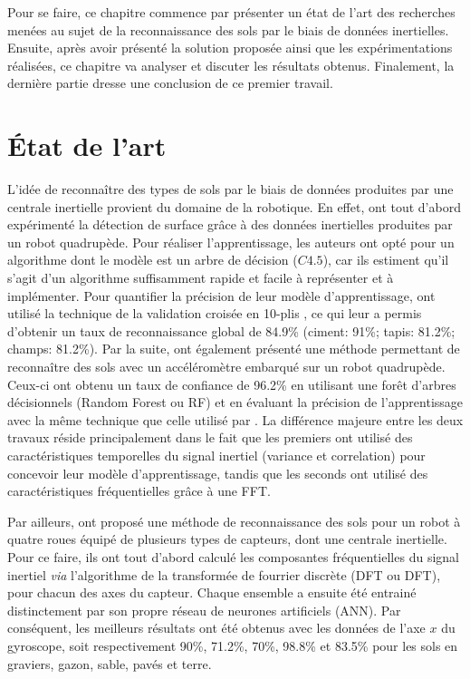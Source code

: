 Pour se faire, ce chapitre commence par présenter un état de l'art des recherches menées au sujet de la reconnaissance des sols par le biais de données inertielles. Ensuite, après avoir présenté la solution proposée ainsi que les expérimentations réalisées, ce chapitre va analyser et discuter les résultats obtenus. Finalement, la dernière partie dresse une conclusion de ce premier travail.

\section{État de l'art}
\label{sec:t1-related-work}

L'idée de reconnaître des types de sols par le biais de données produites par une centrale inertielle provient du domaine de la robotique. En effet, \cite{Vail2004} ont tout d'abord expérimenté la détection de surface grâce à des données inertielles produites par un robot quadrupède. Pour réaliser l'apprentissage, les auteurs ont opté pour un algorithme dont le modèle est un arbre de décision ($C4.5$), car ils estiment qu'il s'agit d'un algorithme suffisamment rapide et facile à représenter et à implémenter. Pour quantifier la précision de leur modèle d'apprentissage, \citeauthor{Vail2004} ont utilisé la technique de la validation croisée en 10-plis \citep{Kohavi1995}, ce qui leur a permis d'obtenir un taux de reconnaissance global de 84.9\% (ciment: 91\%; tapis: 81.2\%; champs: 81.2\%). Par la suite, \cite{Kertesz2016} ont également présenté une méthode permettant de reconnaître des sols avec un accéléromètre embarqué sur un robot quadrupède. Ceux-ci ont obtenu un taux de confiance de 96.2\% en utilisant une forêt d’arbres décisionnels (\acl{Random Forest} ou \acs{RF}) et en évaluant la précision de l'apprentissage avec la même technique que celle utilisé par \citeauthor{Vail2004}. La différence majeure entre les deux travaux réside principalement dans le fait que les premiers ont utilisé des caractéristiques temporelles du signal inertiel (variance et correlation) pour concevoir leur modèle d'apprentissage, tandis que les seconds ont utilisé des caractéristiques fréquentielles grâce à une \acs{FFT}.

Par ailleurs, \cite{Bibuli2007} ont proposé une méthode de reconnaissance des sols pour un robot à quatre roues équipé de plusieurs types de capteurs, dont une centrale inertielle. Pour ce faire, ils ont tout d'abord calculé les composantes fréquentielles du signal inertiel \textit{via} l'algorithme de la transformée de fourrier discrète (\acl{DFT} ou \acs{DFT}), pour chacun des axes du capteur. Chaque ensemble a ensuite été entrainé distinctement par son propre réseau de neurones artificiels (\acs{ANN}). Par conséquent, les meilleurs résultats ont été obtenus avec les données de l'axe $x$ du gyroscope, soit respectivement 90\%, 71.2\%, 70\%, 98.8\% et 83.5\% pour les sols en graviers, gazon, sable, pavés et terre. 

